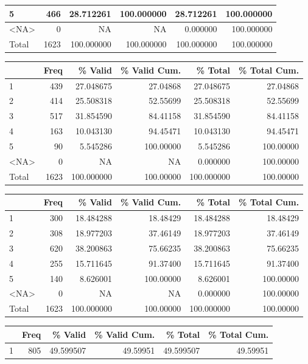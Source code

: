 \documentclass[
  letterpaper,
  DIV=11,
  numbers=noendperiod]{scrartcl}
\begin{document}
\begin{table}
\begin{tabular}[t]{l|r|r|r|r|r}
\hline
5 & 466 & 28.712261 & 100.000000 & 28.712261 & 100.000000\\
\hline
<NA> & 0 & NA & NA & 0.000000 & 100.000000\\
\hline
Total & 1623 & 100.000000 & 100.000000 & 100.000000 & 100.000000\\
\hline
\end{tabular}
\centering
\begin{tabular}[t]{l|r|r|r|r|r}
\hline
  & Freq & \% Valid & \% Valid Cum. & \% Total & \% Total Cum.\\
\hline
1 & 439 & 27.048675 & 27.04868 & 27.048675 & 27.04868\\
\hline
2 & 414 & 25.508318 & 52.55699 & 25.508318 & 52.55699\\
\hline
3 & 517 & 31.854590 & 84.41158 & 31.854590 & 84.41158\\
\hline
4 & 163 & 10.043130 & 94.45471 & 10.043130 & 94.45471\\
\hline
5 & 90 & 5.545286 & 100.00000 & 5.545286 & 100.00000\\
\hline
<NA> & 0 & NA & NA & 0.000000 & 100.00000\\
\hline
Total & 1623 & 100.000000 & 100.00000 & 100.000000 & 100.00000\\
\hline
\end{tabular}
\centering
\begin{tabular}[t]{l|r|r|r|r|r}
\hline
  & Freq & \% Valid & \% Valid Cum. & \% Total & \% Total Cum.\\
\hline
1 & 300 & 18.484288 & 18.48429 & 18.484288 & 18.48429\\
\hline
2 & 308 & 18.977203 & 37.46149 & 18.977203 & 37.46149\\
\hline
3 & 620 & 38.200863 & 75.66235 & 38.200863 & 75.66235\\
\hline
4 & 255 & 15.711645 & 91.37400 & 15.711645 & 91.37400\\
\hline
5 & 140 & 8.626001 & 100.00000 & 8.626001 & 100.00000\\
\hline
<NA> & 0 & NA & NA & 0.000000 & 100.00000\\
\hline
Total & 1623 & 100.000000 & 100.00000 & 100.000000 & 100.00000\\
\hline
\end{tabular}
\centering
\begin{tabular}[t]{l|r|r|r|r|r}
\hline
  & Freq & \% Valid & \% Valid Cum. & \% Total & \% Total Cum.\\
\hline
1 & 805 & 49.599507 & 49.59951 & 49.599507 & 49.59951\\

\end{tabular}
\end{table}
\end{document}
